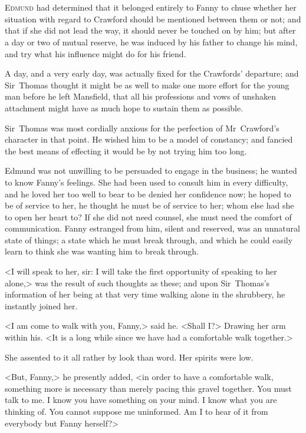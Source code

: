 \chapter[Chapter \thechapter]{} 

 \lettrine[lraise=0.3]{E}{dmund} had determined that it belonged entirely to Fanny to chuse whether her situation with regard to Crawford should be mentioned between them or not; and that if she did not lead the way, it should never be touched on by him; but after a day or two of mutual reserve, he was induced by his father to change his mind, and try what his influence might do for his friend.

A day, and a very early day, was actually fixed for the Crawfords' departure; and Sir~Thomas thought it might be as well to make one more effort for the young man before he left Mansfield, that all his professions and vows of unshaken attachment might have as much hope to sustain them as possible.

Sir~Thomas was most cordially anxious for the perfection of Mr~Crawford's character in that point. He wished him to be a model of constancy; and fancied the best means of effecting it would be by not trying him too long.

Edmund was not unwilling to be persuaded to engage in the business; he wanted to know Fanny's feelings. She had been used to consult him in every difficulty, and he loved her too well to bear to be denied her confidence now; he hoped to be of service to her, he thought he must be of service to her; whom else had she to open her heart to? If she did not need counsel, she must need the comfort of communication. Fanny estranged from him, silent and reserved, was an unnatural state of things; a state which he must break through, and which he could easily learn to think she was wanting him to break through.

<I will speak to her, sir: I will take the first opportunity of speaking to her alone,> was the result of such thoughts as these; and upon Sir~Thomas's information of her being at that very time walking alone in the shrubbery, he instantly joined her.

<I am come to walk with you, Fanny,> said he. <Shall I?> Drawing her arm within his. <It is a long while since we have had a comfortable walk together.>

She assented to it all rather by look than word. Her spirits were low.

<But, Fanny,> he presently added, <in order to have a comfortable walk, something more is necessary than merely pacing this gravel together. You must talk to me. I know you have something on your mind. I know what you are thinking of. You cannot suppose me uninformed. Am I to hear of it from everybody but Fanny herself?>

